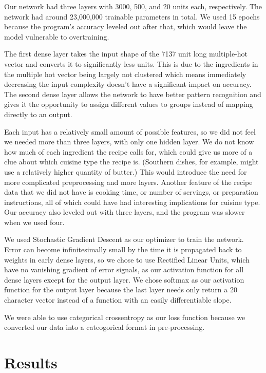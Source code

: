 \documentclass[11pt]{article}
\begin{document}
Our network had three layers with 3000, 500, and 20 units each, respectively. The network had around 23,000,000
trainable parameters in total. We used 15 epochs because the program's accuracy leveled out after that, which would leave the model vulnerable to overtraining. 


The first dense layer takes the input shape of the 7137 unit long multiple-hot vector and converts it to significantly less units. This is due to the ingredients in the multiple hot vector being largely not clustered which means immediately decreasing the input complexity doesn't have a significant impact on accuracy. The second dense layer allows the network to have better pattern recognition and gives it the opportunity to assign different values to groups instead of mapping directly to an output.

Each input has a relatively small amount of possible features, so we did not feel we needed more than three layers, with only one hidden layer. We do not know how much of each ingredient the recipe calls for, which could give us more of a clue about which cuisine type the recipe is. (Southern dishes, for example, might use a relatively higher quantity of butter.) This would introduce the need for more complicated preprocessing and more layers. Another feature of the recipe data that we did not have is cooking time, or number of servings, or preparation instructions, all of which could have had interesting implications for cuisine type. Our accuracy also leveled out with three layers, and the program was slower when we used four. 

We used Stochastic Gradient Descent as our optimizer to train the network. Error can become infinitesimally small by the time it is propagated back to weights in early dense layers, so we chose to use Rectified Linear Units, which have no vanishing gradient of error signals, as our activation function for all dense layers except for the output layer. We chose softmax as our activation function for the output layer because the last layer needs only return a 20 character vector instead of a function with an easily differentiable slope.

We were able to use categorical crossentropy as our loss function because we converted our data into a cateogorical format in pre-processing. 

\section{Results}
\end{document}
